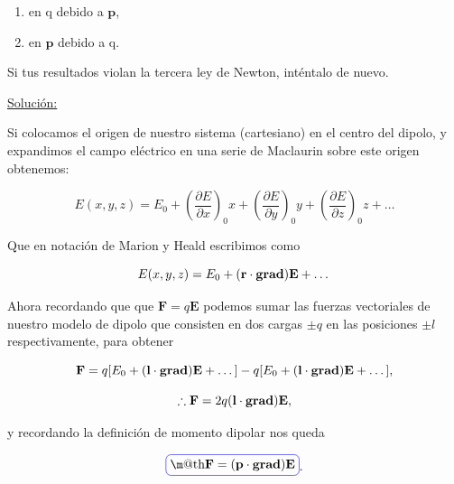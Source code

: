 \documentclass[a4paper,11pt]{article}
\makeatletter
\numberwithin{equation}{section}
\newcommand*{\boxcolor}{blue}
\renewcommand{\boxed}[1]{\textcolor{\boxcolor}{%
\tikz[baseline={([yshift=-1ex]current bounding box.center)}] \node [rectangle, minimum width=1ex,rounded corners,draw] {\normalcolor\m@th$\displaystyle#1$};}}
\makeatother
\begin{document}
\begin{enumerate}[label=\textbf{(\alph*)}]
\item en q debido a $\mathbf{p}$, 
\item en $\mathbf{p}$ debido a q.
\end{enumerate}

Si tus resultados violan la tercera ley de Newton, inténtalo de nuevo.

\vspace{.3cm}

\underline{Solución:} \vspace{.3cm}

Si colocamos el origen de nuestro sistema (cartesiano) en el centro del dipolo, y 
expandimos el campo eléctrico en una serie de Maclaurin sobre este origen obtenemos:

\begin{equation}
 E(x,y,z) = E_0 + \left(\frac{\partial E}{\partial x} \right)_0 x + 
  \left(\frac{\partial E}{\partial y} \right)_0 y + 
   \left(\frac{\partial E}{\partial z} \right)_0 z + \dots
\end{equation}

Que en notación de Marion y Heald \cite{marion2} escribimos como 

\begin{equation}
 E(x,y,z) = E_0 + (\mathbf{r}\cdot \text{\textbf{grad}})\mathbf{E} + \dots 
\end{equation}

Ahora recordando que que $\mathbf{F} = q\mathbf{E}$ podemos sumar las fuerzas 
vectoriales de nuestro modelo de dipolo que consisten en dos cargas $\pm q$ en 
las posiciones $\pm l$ respectivamente, para obtener 

\begin{equation}
 \mathbf{F} = q[E_0 + (\mathbf{l}\cdot \text{\textbf{grad}})\mathbf{E} + \dots ]
 - q[E_0 + (\mathbf{l}\cdot \text{\textbf{grad}})\mathbf{E} + \dots ],
\end{equation}

\begin{equation}
 \therefore \mathbf{F} = 2q (\mathbf{l}\cdot \text{\textbf{grad}})\mathbf{E},
\end{equation}

y recordando la definición de momento dipolar nos queda 

\begin{equation}
 \boxed{\mathbf{F} = (\mathbf{p}\cdot \text{\textbf{grad}})\mathbf{E}}.
\end{equation}
\end{document}
